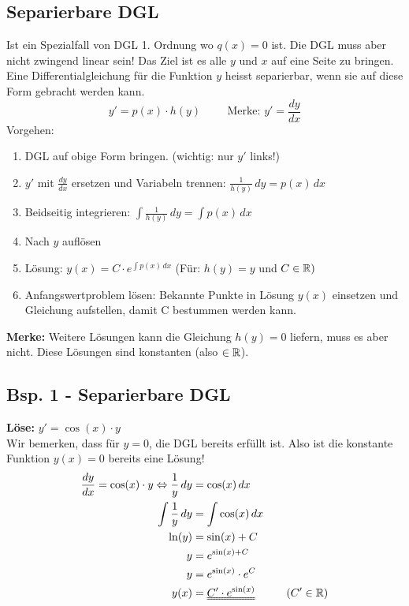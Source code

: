 \subsection{Separierbare DGL}
Ist ein Spezialfall von DGL 1. Ordnung wo $q(x) = 0$ ist. Die DGL muss aber nicht zwingend linear sein! Das Ziel ist es alle $y$ und $x$ auf eine Seite zu bringen.
Eine Differentialgleichung für die Funktion $y$ heisst separierbar, wenn sie auf diese Form gebracht werden kann.
\[
	y' = p(x) \cdot h(y) \hspace{1cm} \text{Merke: $y' = \frac{dy}{dx}$}
\]
Vorgehen:
\begin{enumerate}
	\item DGL auf obige Form bringen. (wichtig: nur $y'$ links!)

	\item $y'$ mit $\frac{dy}{dx}$ ersetzen und Variabeln trennen: $\frac{1}{h(y)} \, dy = p(x) \, dx$

	\item Beidseitig integrieren: $\int \frac{1}{h(y)} \, dy = \int p(x) \, dx$

	\item Nach $y$ auflösen

	\item Lösung: $y(x) = C \cdot e^{\int p(x) \, dx}$ \hspace{0.5cm} (Für: $h(y) = y$ und $C \in \mathbb{R})$

	\item Anfangswertproblem lösen: Bekannte Punkte in Lösung $y(x)$ einsetzen und Gleichung aufstellen, damit C bestummen werden kann.
\end{enumerate}
\textbf{Merke:} Weitere Lösungen kann die Gleichung $h(y) = 0$ liefern, muss es aber nicht. Diese Lösungen sind konstanten (also $\in \mathbb{R}$).

\subsection{Bsp. 1 - Separierbare DGL}
\textbf{Löse:} $y' = \cos(x) \cdot y$ \\
{\small Wir bemerken, dass für $y = 0$, die DGL bereits erfüllt ist. Also ist die konstante Funktion $y(x) = 0$ bereits eine Lösung!}
\begin{align*}
	\frac{dy}{dx} = \cos(x) \cdot y \Leftrightarrow \frac{1}{y} \, dy &= \cos(x) \, dx\\
	\int \frac{1}{y} \, dy &= \int \cos(x) \, dx \\
	\ln(y) &= \sin(x) + C\\
	y &= e^{\sin(x) + C} \\
	y &= e^{\sin(x)} \cdot e^C \\
	y(x) &= \uuline{C' \cdot e^{\sin(x)}}	\hspace{1cm} (C' \in \R)
\end{align*}

